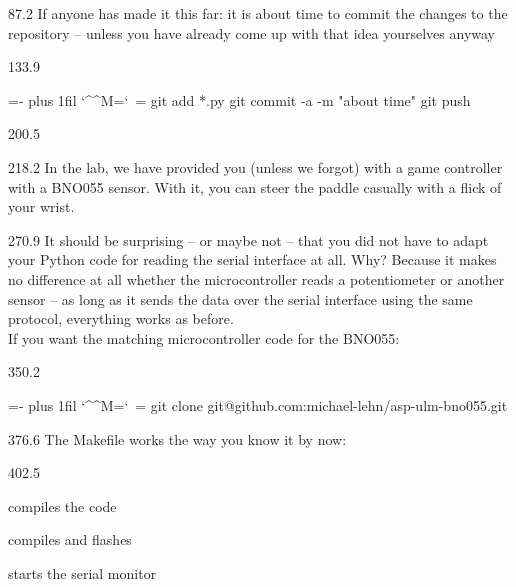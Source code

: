 \documentclass{aslab}
\makeatletter
\newenvironment{pycode}{\par\ttfamily\hyphenchar\font=-1
  \lineskiplimit=-\maxdimen\lineskip=0pt\parindent=0pt
  \parfillskip=0pt plus 1fil\relax
  \catcode`\^^M=\active\catcode`\ =\active\py@setup\py@gobble}{}
\makeatother
\begin{document}
\begin{region}[pitch=17.5]{87.2}
If anyone has made it this far: it is about time to commit the
changes to the repository -- unless you have already come up with that idea
yourselves anyway 
\end{region}

\begin{region}[pitch=13.2]{133.9}
\begin{pycode}
git add *.py
git commit -a -m "about time"
git push
\end{pycode}
\end{region}

\begin{region}{200.5}
\end{region}

\begin{region}[pitch=13.15]{218.2}
In the lab, we have provided you (unless we forgot) with a game controller
with a BNO055 sensor. With it, you can steer the paddle casually with a
flick of your wrist.
\end{region}

\begin{region}[pitch=13.18]{270.9}
It should be surprising -- or maybe not -- that you did not have to adapt
your Python code for reading the serial interface at all. Why? Because it
makes no difference at all whether the microcontroller reads a potentiometer
or another sensor -- as long as it sends the data over the serial interface
using the same protocol, everything works as before.\\
If you want the matching microcontroller code for the BNO055:
\end{region}

\begin{region}[]{350.2}
\begin{pycode}
git clone git@github.com:michael-lehn/asp-ulm-bno055.git
\end{pycode}
\end{region}

\begin{region}{376.6}
The Makefile works the way you know it by now:
\end{region}

\begin{region}[pitch=13.5]{402.5}
\begin{dashlist}
\item {} compiles the code
\item {} compiles and flashes
\item {} starts the serial monitor
\end{dashlist}
\end{region}
\end{document}
